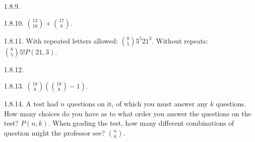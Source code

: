 \begin {itemize}
\begin{ans}{1.8.9.}
	
\end{ans}
\begin{ans}{1.8.10.}
		${13 \choose 10} + {17 \choose 8}$.
	
\end{ans}
\begin{ans}{1.8.11.}
		 With repeated letters allowed: ${8 \choose 5}5^5 21^3$.  Without repeats: ${8 \choose 5}5! P(21, 3)$.
	
\end{ans}
\begin{ans}{1.8.12.}
	
\end{ans}
\begin{ans}{1.8.13.}
		 ${18 \choose 8}\left({18 \choose 8} - 1\right)$.
	
\end{ans}
\begin{ans}{1.8.14.}
		 A test had $n$ questions on it, of which you must answer any $k$ questions.  How many choices do you have as to what order you answer the questions on the test?  $P(n,k)$.  When grading the test, how many different combinations of question might the professor see?  ${n \choose k}$.
	

\end{ans}
\end{itemize}
